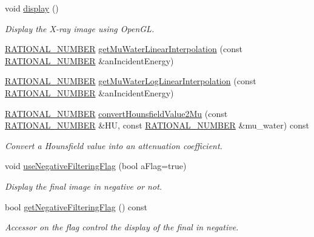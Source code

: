 \begin{DoxyCompactItemize}
void \hyperlink{classg_virtual_x_ray_1_1_x_ray_renderer_a3e9ed824d8c1b773fc3222abdf70c948}{display} ()
\begin{DoxyCompactList}\small\item\em Display the X-\/ray image using OpenGL. \end{DoxyCompactList}\item 
\hyperlink{namespace_utilities_a40969b96bd8d847b962e297cb79f08ce}{RATIONAL\_\-NUMBER} \hyperlink{classg_virtual_x_ray_1_1_x_ray_renderer_a834e6523f215a725d20cfc6b093e93a9}{getMuWaterLinearInterpolation} (const \hyperlink{namespace_utilities_a40969b96bd8d847b962e297cb79f08ce}{RATIONAL\_\-NUMBER} \&anIncidentEnergy)
\item 
\hyperlink{namespace_utilities_a40969b96bd8d847b962e297cb79f08ce}{RATIONAL\_\-NUMBER} \hyperlink{classg_virtual_x_ray_1_1_x_ray_renderer_ae2a99079450fe70d5c0070445296200e}{getMuWaterLogLinearInterpolation} (const \hyperlink{namespace_utilities_a40969b96bd8d847b962e297cb79f08ce}{RATIONAL\_\-NUMBER} \&anIncidentEnergy)
\item 
\hyperlink{namespace_utilities_a40969b96bd8d847b962e297cb79f08ce}{RATIONAL\_\-NUMBER} \hyperlink{classg_virtual_x_ray_1_1_x_ray_renderer_a14b80bab07a5b51b2069da606677f7ed}{convertHounsfieldValue2Mu} (const \hyperlink{namespace_utilities_a40969b96bd8d847b962e297cb79f08ce}{RATIONAL\_\-NUMBER} \&HU, const \hyperlink{namespace_utilities_a40969b96bd8d847b962e297cb79f08ce}{RATIONAL\_\-NUMBER} \&mu\_\-water) const 
\begin{DoxyCompactList}\small\item\em Convert a Hounsfield value into an attenuation coefficient. \end{DoxyCompactList}\item 
void \hyperlink{classg_virtual_x_ray_1_1_x_ray_renderer_ac2969e479dce456def60e7b88e2184a9}{useNegativeFilteringFlag} (bool aFlag=true)
\begin{DoxyCompactList}\small\item\em Display the final image in negative or not. \end{DoxyCompactList}\item 
bool \hyperlink{classg_virtual_x_ray_1_1_x_ray_renderer_a945c565e34cf7b754adbad3ed4d96191}{getNegativeFilteringFlag} () const 
\begin{DoxyCompactList}\small\item\em Accessor on the flag control the display of the final in negative. \end{DoxyCompactList}\item 

\end{DoxyCompactItemize}
